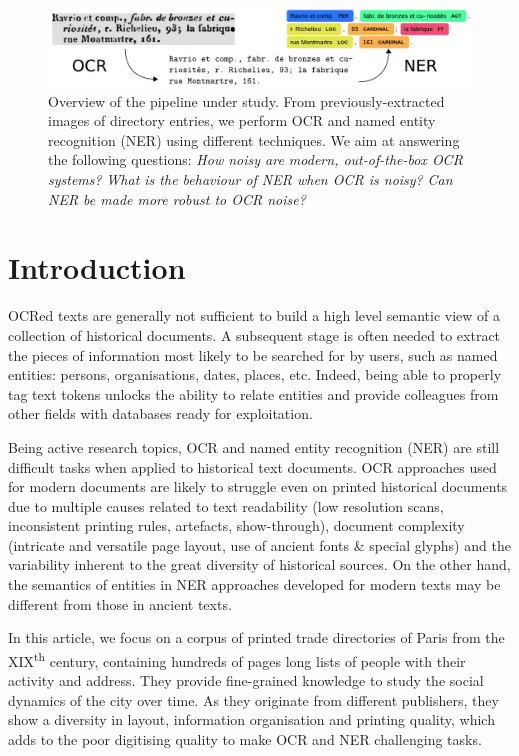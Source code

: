 \begin{figure}[!h]
    \centering
    \includegraphics[width=.9\textwidth]{figs/overview-intro.pdf}
    \caption{%
    Overview of the pipeline under study.
    From previously-extracted images of directory entries, 
    we perform OCR and named entity recognition (NER) using different techniques.
    We aim at answering the following questions:
    \emph{How noisy are modern, out-of-the-box OCR systems?}
    \emph{What is the behaviour of NER when OCR is noisy?}
    \emph{Can NER be made more robust to OCR noise?}
    }
    \label{fig.pipeline-overview}
\end{figure}
\clearpage%

\section{Introduction}

OCRed texts are generally not sufficient to build a high level semantic view of a collection of historical documents.
A subsequent stage is often needed to extract the pieces of information most likely to be searched for by users, such as named entities: persons, organisations, dates, places, etc.
Indeed, being able to properly tag text tokens unlocks the ability to relate entities and provide colleagues from other fields with databases ready for exploitation.

Being active research topics, OCR and named entity recognition (NER) are still difficult tasks when applied to historical text documents.
OCR approaches used for modern documents are likely to struggle even on printed historical documents due to multiple causes related to text readability (low resolution scans, inconsistent printing rules, artefacts, show-through), document complexity (intricate and versatile page layout, use of ancient fonts \& special glyphs) and the variability inherent to the great diversity of historical sources.
On the other hand, the semantics of entities in NER approaches developed for modern texts may be different from those in ancient texts.

In this article, we focus on a corpus of printed trade directories of Paris from the XIX\textsuperscript{th} century, containing hundreds of pages long lists of people with their activity and address.
They provide fine-grained knowledge to study the social dynamics of the city over time.
As they originate from different publishers, they show a diversity in layout, information organisation and printing quality, which adds to the poor digitising quality to make OCR and NER challenging tasks.

